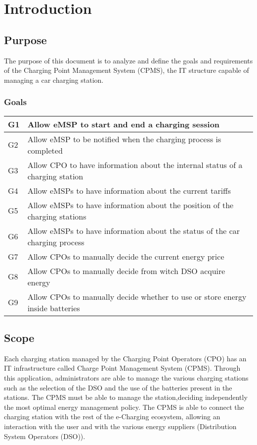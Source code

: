 \chapter{Introduction}
\section{Purpose}
The purpose of this document is to analyze and define the goals and requirements of the Charging Point Management System (CPMS), the IT structure capable of managing a car charging station.
\subsection{Goals}
\begin{tabular}{ |l|l| } 
\hline 
G1 & Allow eMSP to start and end a charging session\\
 \hline 
G2 & Allow eMSP to be notified when the charging process is completed\\
 \hline
G3 & Allow CPO to have information about the internal status of a charging station\\
 \hline
G4 & Allow eMSPs to have information about the current tariffs\\
 \hline
G5 & Allow eMSPs to have information about the position of the charging stations\\
 \hline
G6 & Allow eMSPs to have information about the status of the car charging process \\
 \hline
G7 & Allow CPOs to manually decide the current energy price \\
\hline
G8 & Allow CPOs to manually decide from witch DSO acquire energy \\
 \hline
G9 & Allow CPOs to manually decide whether to use or store energy inside batteries \\
\hline
\end{tabular}

\section{Scope}
Each charging station managed by the Charging Point Operators (CPO) has an IT infrastructure called Charge Point Management System (CPMS). Through this application, administrators are able to manage the various charging stations such as the selection of the DSO and the use of the batteries present in the stations. The CPMS must be able to manage the station,deciding independently the most optimal energy management policy. The CPMS is able to connect the charging station with the rest of the e-Charging ecosystem, allowing an interaction with the user and with the various energy suppliers (Distribution System Operators (DSO)).\\


